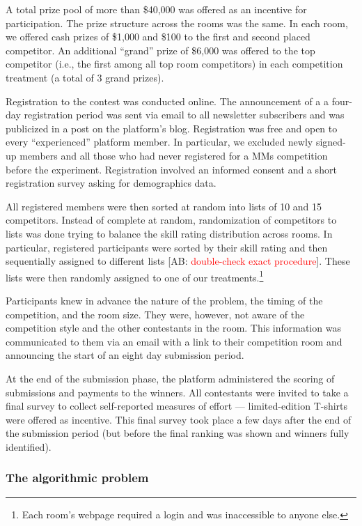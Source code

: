 \documentclass[11pt, titlepage]{article}
\begin{document}
A total prize pool of more than \$40,000 was offered as an incentive for
participation. The prize structure across the rooms was the same. In
each room, we offered cash prizes of \$1,000 and \$100 to the first and
second placed competitor. An additional ``grand'' prize of \$6,000 was
offered to the top competitor (i.e., the first among all top room
competitors) in each competition treatment (a total of 3 grand prizes).

Registration to the contest was conducted online. The announcement of a
a four-day registration period was sent via email to all newsletter
subscribers and was publicized in a post on the platform's blog.
Registration was free and open to every ``experienced'' platform member.
In particular, we excluded newly signed-up members and all those who had
never registered for a MMs competition before the experiment.
Registration involved an informed consent and a short registration
survey asking for demographics data.

All registered members were then sorted at random into lists of 10 and
15 competitors. Instead of complete at random, randomization of
competitors to lists was done trying to balance the skill rating
distribution across rooms. In particular, registered participants were
sorted by their skill rating and then sequentially assigned to different
lists {[}AB: \textcolor{red}{double-check exact procedure}{]}. These
lists were then randomly assigned to one of our treatments.\footnote{Each
  room's webpage required a login and was inaccessible to anyone else.}

Participants knew in advance the nature of the problem, the timing of
the competition, and the room size. They were, however, not aware of the
competition style and the other contestants in the room. This
information was communicated to them via an email with a link to their
competition room and announcing the start of an eight day submission
period.

At the end of the submission phase, the platform administered the
scoring of submissions and payments to the winners. All contestants were
invited to take a final survey to collect self-reported measures of
effort --- limited-edition T-shirts were offered as incentive. This
final survey took place a few days after the end of the submission
period (but before the final ranking was shown and winners fully
identified).

\subsubsection{The algorithmic problem}\label{the-algorithmic-problem}
\end{document}
